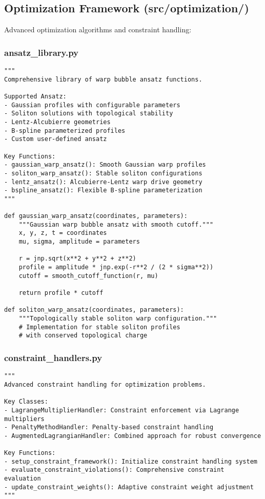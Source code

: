 \documentclass{article}
\begin{document}
\subsection{Optimization Framework (src/optimization/)}

Advanced optimization algorithms and constraint handling:

\subsubsection{ansatz\_library.py}
\begin{lstlisting}
"""
Comprehensive library of warp bubble ansatz functions.

Supported Ansatz:
- Gaussian profiles with configurable parameters
- Soliton solutions with topological stability
- Lentz-Alcubierre geometries
- B-spline parameterized profiles
- Custom user-defined ansatz

Key Functions:
- gaussian_warp_ansatz(): Smooth Gaussian warp profiles
- soliton_warp_ansatz(): Stable soliton configurations
- lentz_ansatz(): Alcubierre-Lentz warp drive geometry
- bspline_ansatz(): Flexible B-spline parameterization
"""

def gaussian_warp_ansatz(coordinates, parameters):
    """Gaussian warp bubble ansatz with smooth cutoff."""
    x, y, z, t = coordinates
    mu, sigma, amplitude = parameters
    
    r = jnp.sqrt(x**2 + y**2 + z**2)
    profile = amplitude * jnp.exp(-r**2 / (2 * sigma**2))
    cutoff = smooth_cutoff_function(r, mu)
    
    return profile * cutoff

def soliton_warp_ansatz(coordinates, parameters):
    """Topologically stable soliton warp configuration."""
    # Implementation for stable soliton profiles
    # with conserved topological charge
\end{lstlisting}

\subsubsection{constraint\_handlers.py}
\begin{lstlisting}
"""
Advanced constraint handling for optimization problems.

Key Classes:
- LagrangeMultiplierHandler: Constraint enforcement via Lagrange multipliers
- PenaltyMethodHandler: Penalty-based constraint handling
- AugmentedLagrangianHandler: Combined approach for robust convergence

Key Functions:
- setup_constraint_framework(): Initialize constraint handling system
- evaluate_constraint_violations(): Comprehensive constraint evaluation
- update_constraint_weights(): Adaptive constraint weight adjustment
"""
\end{lstlisting}
\end{document}
